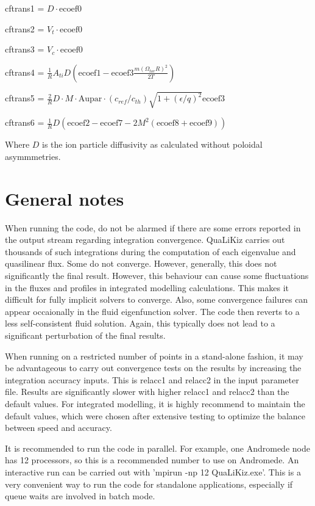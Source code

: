 \documentclass{article}
\begin{document}
\begin{description}
cftrans1 = $D{\cdot}\mathrm{ecoef0}$ 

cftrans2 = $V_t{\cdot}\mathrm{ecoef0}$

cftrans3 = $V_c{\cdot}\mathrm{ecoef0}$ 

cftrans4 = $\frac{1}{R}A_{ti}D(\mathrm{ecoef1}-\mathrm{ecoef3}\frac{m({\Omega_{tor}}R)^2}{2T})$

cftrans5 = $\frac{2}{R}D{\cdot}M{\cdot}\mathrm{Aupar}{\cdot}(c_{ref}/c_{th})\sqrt{1+(\epsilon/q)^2}\mathrm{ecoef3}$

cftrans6 = $\frac{1}{R}D(\mathrm{ecoef2} - \mathrm{ecoef7} - 2M^2( \mathrm{ecoef8} + \mathrm{ecoef9}))$

Where $D$ is the ion particle diffusivity as calculated without poloidal asymmmetries. 

\end{description} 

\section{General notes}
When running the code, do not be alarmed if there are some errors reported in the output stream regarding integration convergence. QuaLiKiz carries out thousands of such integrations during the
computation of each eigenvalue and quasilinear flux. Some do not converge. However, generally, this does not significantly the final result. However, this behaviour can cause some fluctuations in the
fluxes and profiles in integrated modelling calculations. This makes it difficult for fully implicit solvers to converge. Also, some convergence failures can appear occaionally in the fluid eigenfunction
solver. The code then reverts to a less self-consistent fluid solution. Again, this typically does not lead to a significant perturbation of the final results.

When running on a restricted number of points in a stand-alone fashion, it may be advantageous to carry out convergence tests on the results by increasing the integration accuracy inputs. This is relacc1 and relacc2 in
the input parameter file. Results are significantly slower with higher relacc1 and relacc2 than the default values. For integrated modelling, it is highly recommend to maintain the default values, which were chosen after extensive testing to optimize the balance between speed and accuracy. 

It is recommended to run the code in parallel. For example, one Andromede node has 12 processors, so this is a recommended number to use on Andromede. An interactive run can be carried out with 'mpirun -np 12 QuaLiKiz.exe'. This is a very convenient way to run the code for standalone applications, especially if queue waits are involved in batch mode.
\end{document}
